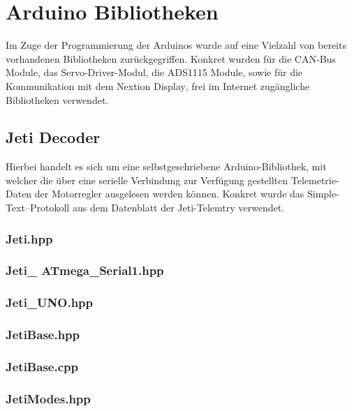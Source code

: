 \section{Arduino Bibliotheken}
Im Zuge der Programmierung der Arduinos wurde auf eine Vielzahl von bereits vorhandenen Bibliotheken zurückgegriffen. Konkret wurden für die CAN-Bus Module\textsuperscript{\cite{ArduinoBibliothekCANBus}}, 
das Servo-Driver-Modul\textsuperscript{\cite{ArduinoBibliothekServoPWM}}, 
die ADS1115 Module\textsuperscript{\cite{ArduinoBibliothekADS1115}}, 
sowie für die Kommunikation mit dem Nextion Display\textsuperscript{\cite{ArduinoBibliothekNextion}}, frei im Internet zugängliche Bibliotheken verwendet.
\subsection{Jeti Decoder}
Hierbei handelt es sich um eine selbstgeschriebene Arduino-Bibliothek, mit welcher die über eine serielle Verbindung zur Verfügung gestellten Telemetrie-Daten der Motorregler ausgelesen werden können. Konkret wurde das \glqq Simple-Text\grqq--Protokoll aus dem Datenblatt der Jeti-Telemtry\textsuperscript{\cite{JetiTelemtry}} verwendet.
\subsubsection{Jeti.hpp}

\subsubsection{Jeti\_ ATmega\_Serial1.hpp}

\subsubsection{Jeti\_UNO.hpp}

\subsubsection{JetiBase.hpp}

\subsubsection{JetiBase.cpp}


\subsubsection{JetiModes.hpp}

\clearpage
